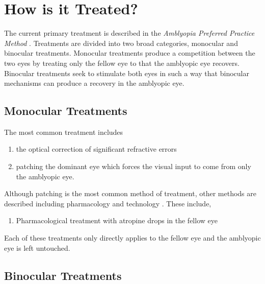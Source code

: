 \documentclass[
  letterpaper,
  number]{elsarticle}
\providecommand{\tightlist}{%
  \setlength{\itemsep}{0pt}\setlength{\parskip}{0pt}}\usepackage{longtable,booktabs,array}
\begin{document}
\hypertarget{how-is-it-treated}{%
\section{How is it Treated?}\label{how-is-it-treated}}

The current primary treatment is described in the \emph{Amblyopia
Preferred Practice Method} \citep{wallace2018amblyopia}. Treatments are
divided into two broad categories, monocular and binocular treatments.
Monocular treatments produce a competition between the two eyes by
treating only the fellow eye to that the amblyopic eye recovers.
Binocular treatments seek to stimulate both eyes in such a way that
binocular mechanisms can produce a recovery in the amblyopic eye.

\hypertarget{monocular-treatments}{%
\subsection{Monocular Treatments}\label{monocular-treatments}}

The most common treatment includes

\begin{enumerate}
\def\labelenumi{\arabic{enumi}.}
\tightlist
\item
  the optical correction of significant refractive errors
\item
  patching the dominant eye which forces the visual input to come from
  only the amblyopic eye.
\end{enumerate}

Although patching is the most common method of treatment, other methods
are described including pharmacology and technology
\citep{holmes2016randomized, Kelly_2016, Holmes_2016, Li:2015aa, de2007current, Gao_2018, glaser2002randomized}.
These include,

\begin{enumerate}
\def\labelenumi{\arabic{enumi}.}
\setcounter{enumi}{2}
\tightlist
\item
  Pharmacological treatment with atropine drops in the fellow eye
\end{enumerate}

Each of these treatments only directly applies to the fellow eye and the
amblyopic eye is left untouched.

\hypertarget{binocular-treatments}{%
\subsection{Binocular Treatments}\label{binocular-treatments}}
\end{document}
